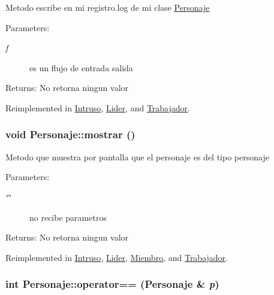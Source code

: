Metodo escribe en mi registro.log de mi clase \hyperlink{classPersonaje}{Personaje} \begin{Desc}
\item[Parameters:]
\begin{description}
\item[{\em f}]es un flujo de entrada salida \end{description}
\end{Desc}
\begin{Desc}
\item[Returns:]No retorna ningun valor \end{Desc}


Reimplemented in \hyperlink{classIntruso_979c89c596d92d8ce69b8af5e556d62d}{Intruso}, \hyperlink{classLider_fcd179370f87dbc08bf6619ff9742f66}{Lider}, and \hyperlink{classTrabajador_332796b26094df07fa7b8b39c345f8f4}{Trabajador}.\hypertarget{classPersonaje_e9f6bd8027b8a5c2e660a327d9e513ca}{
\subsubsection[mostrar]{\setlength{\rightskip}{0pt plus 5cm}void Personaje::mostrar ()}}
\label{classPersonaje_e9f6bd8027b8a5c2e660a327d9e513ca}


Metodo que muestra por pantalla que el personaje es del tipo personaje \begin{Desc}
\item[Parameters:]
\begin{description}
\item[{\em \char`\"{}\char`\"{}}]no recibe parametros \end{description}
\end{Desc}
\begin{Desc}
\item[Returns:]No retorna ningun valor \end{Desc}


Reimplemented in \hyperlink{classIntruso_06a5d236e669e5add8b1c6472303133e}{Intruso}, \hyperlink{classLider_125acbb3a1432f217efdc9826a2b8d8f}{Lider}, \hyperlink{classMiembro_28498c7229e81e64d0cb7ea69515dca0}{Miembro}, and \hyperlink{classTrabajador_49e5a94181d6a517d9f5213335da1e27}{Trabajador}.\hypertarget{classPersonaje_5870893672c215b1d99594233f7f5fd0}{
\subsubsection[operator==]{\setlength{\rightskip}{0pt plus 5cm}int Personaje::operator== ({\bf Personaje} \& {\em p})}}
\label{classPersonaje_5870893672c215b1d99594233f7f5fd0}


